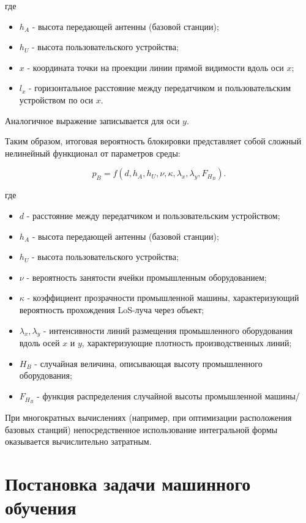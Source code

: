 \documentclass[%
]{ittmm}
\begin{document}
где 

\begin{itemize}
  \item $h_A$ - высота передающей антенны (базовой станции);
  \item $h_U$ - высота пользовательского устройства;
  \item $x$ - координата точки на проекции линии прямой видимости вдоль оси $x$;
  \item $l_x$ - горизонтальное расстояние между передатчиком и пользовательским устройством по оси $x$.
\end{itemize}

Аналогичное выражение записывается для оси $y$.

Таким образом, итоговая вероятность блокировки представляет собой сложный нелинейный функционал от параметров среды:

\begin{equation}
p_B = f(d, h_A, h_U, \nu, \kappa, \lambda_x, \lambda_y, F_{H_B}).
\end{equation}

где 

\begin{itemize}
  \item $d$ - расстояние между передатчиком и пользовательским устройством;
  \item $h_A$ - высота передающей антенны (базовой станции);
  \item $h_U$ - высота пользовательского устройства;
  \item $\nu$ - вероятность занятости ячейки промышленным оборудованием;
  \item $\kappa$ - коэффициент прозрачности промышленной машины, характеризующий вероятность прохождения LoS-луча через объект;
  \item $\lambda_x, \lambda_y$ - интенсивности линий размещения промышленного оборудования вдоль осей $x$ и $y$, характеризующие плотность производственных линий;
  \item $H_B$ - случайная величина, описывающая высоту промышленного оборудования;
  \item $F_{H_B}$ - функция распределения случайной высоты промышленной машины/
\end{itemize}

При многократных вычислениях (например, при оптимизации расположения базовых станций) непосредственное использование интегральной формы оказывается вычислительно затратным.

\section{Постановка задачи машинного обучения}
\end{document}
